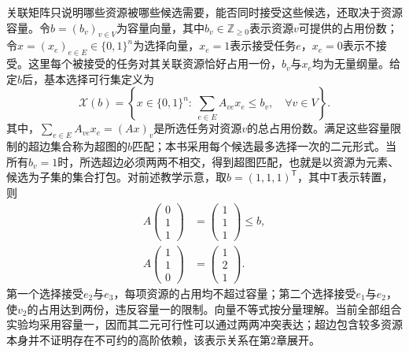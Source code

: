 关联矩阵只说明哪些资源被哪些候选需要，能否同时接受这些候选，还取决于资源容量。令$b=(b_v)_{v\in V}$为容量向量，其中$b_v\in\mathbb{Z}_{\geq0}$表示资源$v$可提供的占用份数；令$x=(x_e)_{e\in E}\in\{0,1\}^{n}$为选择向量，$x_e=1$表示接受任务$e$，$x_e=0$表示不接受。这里每个被接受的任务对其关联资源恰好占用一份，$b_v$与$x_e$均为无量纲量。给定$b$后，基本选择可行集定义为
\begin{equation}
 \mathcal{X}(b)=\left\{
 x\in\{0,1\}^{n}:\ 
 \sum_{e\in E}A_{ve}x_e\leq b_v,\quad \forall v\in V
 \right\}.
 \label{s0102:feasible_set}
\end{equation}
其中，$\sum_{e\in E}A_{ve}x_e=(Ax)_v$是所选任务对资源$v$的总占用份数。满足这些容量限制的超边集合称为超图的$b$匹配；本书采用每个候选最多选择一次的二元形式。当所有$b_v=1$时，所选超边必须两两不相交，得到超图匹配，也就是以资源为元素、候选为子集的集合打包。对前述教学示意，取$b=(1,1,1)^{\mathsf T}$，其中$\mathsf T$表示转置，则
\begin{align}
 A\begin{pmatrix}0\\1\\1\end{pmatrix}
 &=\begin{pmatrix}1\\1\\1\end{pmatrix}\leq b,
 \label{s0102:feasible_example}\\
 A\begin{pmatrix}1\\1\\0\end{pmatrix}
 &=\begin{pmatrix}1\\2\\1\end{pmatrix}.
 \label{s0102:infeasible_example}
\end{align}
第一个选择接受$e_2$与$e_3$，每项资源的占用均不超过容量；第二个选择接受$e_1$与$e_2$，使$v_2$的占用达到两份，违反容量一的限制。向量不等式按分量理解。当前全部组合实验均采用容量一，因而其二元可行性可以通过两两冲突表达；超边包含较多资源本身并不证明存在不可约的高阶依赖，该表示关系在第2章展开。

